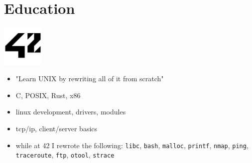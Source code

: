 \section{Education}

\noindent
\begin{minipage}{.15\textwidth}
\centerline{\includegraphics[width=20mm]{img/42}}
\end{minipage}%
\hspace{5mm}
\begin{minipage}{.9\textwidth}
\raggedright
\begin{minipage}[t]{.50\textwidth}
    \begin{itemize}
        \item "Learn UNIX by rewriting all of it from scratch"
        \item C, POSIX, Rust, x86
        \item linux development, drivers, modules
        \item tcp/ip, client/server basics
    \end{itemize}
\end{minipage}
\begin{minipage}[t]{.30\textwidth}
    \begin{itemize}
		\item while at 42 I rewrote the following: \texttt{libc}, \texttt{bash}, \texttt{malloc}, \texttt{printf}, \texttt{nmap}, \texttt{ping}, \texttt{traceroute}, \texttt{ftp}, \texttt{otool}, \texttt{strace}
    \end{itemize}
\end{minipage}
\end{minipage}

